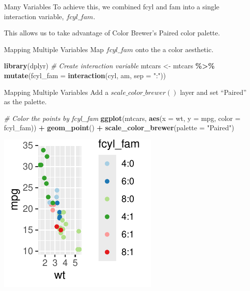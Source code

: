 \documentclass[
  ignorenonframetext,
]{beamer}
\newenvironment{Shaded}{\begin{snugshade}}{\end{snugshade}}
\newcommand{\AttributeTok}[1]{\textcolor[rgb]{0.13,0.29,0.53}{#1}}
\newcommand{\CommentTok}[1]{\textcolor[rgb]{0.56,0.35,0.01}{\textit{#1}}}
\newcommand{\FunctionTok}[1]{\textcolor[rgb]{0.13,0.29,0.53}{\textbf{#1}}}
\newcommand{\NormalTok}[1]{#1}
\newcommand{\OtherTok}[1]{\textcolor[rgb]{0.56,0.35,0.01}{#1}}
\newcommand{\SpecialCharTok}[1]{\textcolor[rgb]{0.81,0.36,0.00}{\textbf{#1}}}
\newcommand{\StringTok}[1]{\textcolor[rgb]{0.31,0.60,0.02}{#1}}
\begin{document}
\begin{frame}{Many Variables}
\label{many-variables-3}
To achieve this, we combined fcyl and fam into a single interaction
variable, \(fcyl\_fam\).

This allows us to take advantage of Color Brewer's Paired color palette.
\end{frame}

\begin{frame}[fragile]{Mapping Multiple Variables}
\label{mapping-multiple-variables}
Map \(fcyl\_fam\) onto the a color aesthetic.


\begin{Shaded}
\begin{Highlighting}[]
\FunctionTok{library}\NormalTok{(dplyr)}
\CommentTok{\# Create interaction variable}
\NormalTok{mtcars }\OtherTok{\textless{}{-}}\NormalTok{ mtcars }\SpecialCharTok{\%\textgreater{}\%}
    \FunctionTok{mutate}\NormalTok{(}\AttributeTok{fcyl\_fam =} \FunctionTok{interaction}\NormalTok{(cyl, am, }\AttributeTok{sep =} \StringTok{":"}\NormalTok{))}
\end{Highlighting}
\end{Shaded}
\end{frame}

\begin{frame}[fragile]{Mapping Multiple Variables}
\label{mapping-multiple-variables-1}
Add a \(scale\_color\_brewer()\) layer and set ``Paired'' as the
palette.


\begin{Shaded}
\begin{Highlighting}[]
\CommentTok{\# Color the points by fcyl\_fam}
\FunctionTok{ggplot}\NormalTok{(mtcars, }\FunctionTok{aes}\NormalTok{(}\AttributeTok{x =}\NormalTok{ wt, }\AttributeTok{y =}\NormalTok{ mpg, }\AttributeTok{color =}\NormalTok{ fcyl\_fam)) }\SpecialCharTok{+} \FunctionTok{geom\_point}\NormalTok{() }\SpecialCharTok{+}
    \FunctionTok{scale\_color\_brewer}\NormalTok{(}\AttributeTok{palette =} \StringTok{"Paired"}\NormalTok{)}
\end{Highlighting}
\end{Shaded}

\begin{center}\includegraphics[width=0.5\linewidth]{Figs/unnamed-chunk-77-1} \end{center}
\end{frame}
\end{document}
